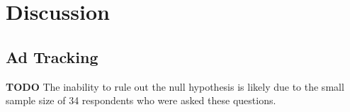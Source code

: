 \documentclass[acmtog]{acmart}
\begin{document}
\section{Discussion}
\subsection{Ad Tracking}
\textbf{TODO}
The inability to rule out the null hypothesis is likely due to the small sample
size of 34 respondents who were asked these questions.





\appendix
\end{document}
